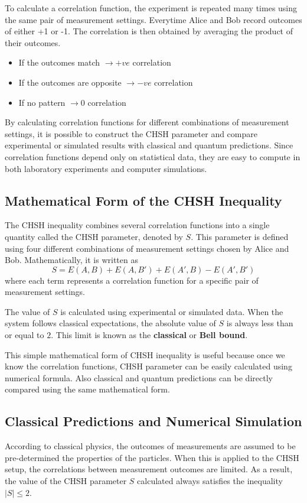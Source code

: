 \documentclass[17pt,a4paper]{extarticle}
\begin{document}
To calculate a correlation function, the experiment is repeated many times using the same pair of measurement settings. Everytime Alice and Bob record outcomes of either +1 or -1. The correlation is then obtained by averaging the product of their outcomes.
\begin{itemize}
    \item If the outcomes match $\rightarrow +ve$ correlation
    \item If the outcomes are opposite $\rightarrow -ve$ correlation
    \item If no pattern $\rightarrow 0$ correlation
\end{itemize}
By calculating correlation functions for different combinations of measurement settings, it is possible to construct the CHSH parameter and compare experimental or simulated results with classical and quantum predictions. Since correlation functions depend only on statistical data, they are easy to compute in both laboratory experiments and computer simulations.

\subsection*{Mathematical Form of the CHSH Inequality}
The CHSH inequality combines several correlation functions into a single quantity called the CHSH parameter, denoted by $S$. This parameter is defined using four different combinations of measurement settings chosen by Alice and Bob. Mathematically, it is written as
\begin{equation*}
S=E(A,B)+E(A,B')+E(A',B)-E(A',B')
\end{equation*}
where each term represents a correlation function for a specific pair of measurement settings.

The value of $S$ is calculated using experimental or simulated data. When the system follows classical expectations, the absolute value of $S$ is always less than or equal to $2$. This limit is known as the \textbf{classical} or \textbf{Bell bound}.

This simple mathematical form of CHSH inequality is useful because once we know the correlation functions, CHSH parameter can be easily calculated using numerical formula. Also classical and quantum predictions can be directly compared using the same mathematical form.

\subsection*{Classical Predictions and Numerical Simulation}
According to classical physics, the outcomes of measurements are assumed to be pre-determined the properties of the particles. When this is applied to the CHSH setup, the correlations between measurement outcomes are limited. As a result, the value of the CHSH parameter $S$ calculated always satisfies the inequality $|S|\leq2$.
\end{document}

